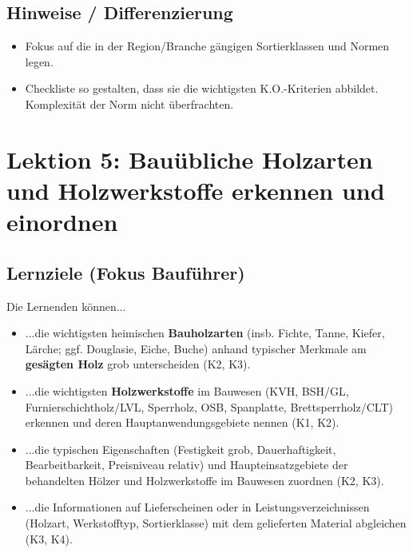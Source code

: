\documentclass[12pt, a4paper]{article}
\begin{document}
\subsection{Hinweise / Differenzierung}
\begin{itemize}
    \item Fokus auf die in der Region/Branche gängigen Sortierklassen und Normen legen.
    \item Checkliste so gestalten, dass sie die wichtigsten K.O.-Kriterien abbildet. Komplexität der Norm nicht überfrachten.
\end{itemize}

\newpage

\section{Lektion 5: Bauübliche Holzarten und Holzwerkstoffe erkennen und einordnen}
\subsection{Lernziele (Fokus Bauführer)}
Die Lernenden können...
\begin{itemize}
    \item ...die wichtigsten heimischen \textbf{Bauholzarten} (insb. Fichte, Tanne, Kiefer, Lärche; ggf. Douglasie, Eiche, Buche) anhand typischer Merkmale am \textbf{gesägten Holz} grob unterscheiden (K2, K3).
    \item ...die wichtigsten \textbf{Holzwerkstoffe} im Bauwesen (KVH, BSH/GL, Furnierschichtholz/LVL, Sperrholz, OSB, Spanplatte, Brettsperrholz/CLT) erkennen und deren Hauptanwendungsgebiete nennen (K1, K2).
    \item ...die typischen Eigenschaften (Festigkeit grob, Dauerhaftigkeit, Bearbeitbarkeit, Preisniveau relativ) und Haupteinsatzgebiete der behandelten Hölzer und Holzwerkstoffe im Bauwesen zuordnen (K2, K3).
    \item ...die Informationen auf Lieferscheinen oder in Leistungsverzeichnissen (Holzart, Werkstofftyp, Sortierklasse) mit dem gelieferten Material abgleichen (K3, K4).
\end{itemize}
\end{document}
